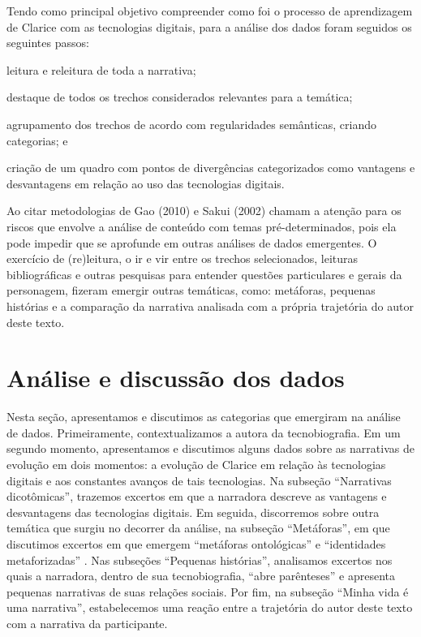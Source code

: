 \documentclass{textolivre}
\begin{document}
Tendo como principal objetivo compreender como foi o processo de aprendizagem de Clarice com as tecnologias digitais, para a análise dos dados foram seguidos os seguintes passos: 
\begin{enumerate*}[label=\itshape\arabic*\upshape)]
\item leitura e releitura de toda a narrativa; 
\item destaque de todos os trechos considerados relevantes para a temática; 
\item agrupamento dos trechos de acordo com regularidades semânticas, criando categorias; e 
\item criação de um quadro com pontos de divergências categorizados como vantagens e desvantagens em relação ao uso das tecnologias digitais.
\end{enumerate*}

Ao citar metodologias de Gao (2010) e Sakui (2002) \textcite{barkuizen2014} chamam a atenção para os riscos que envolve a análise de conteúdo com temas pré-determinados, pois ela pode impedir que se aprofunde em outras análises de dados emergentes. O exercício de (re)leitura, o ir e vir entre os trechos selecionados, leituras bibliográficas e outras pesquisas para entender questões particulares e gerais da personagem, fizeram emergir outras temáticas, como: metáforas, pequenas histórias e a comparação da narrativa analisada com a própria trajetória do autor deste texto.

\section{Análise e discussão dos dados}\label{sec-analise}
Nesta seção, apresentamos e discutimos as categorias que emergiram na análise de dados. Primeiramente, contextualizamos a autora da tecnobiografia. Em um segundo momento, apresentamos e discutimos alguns dados sobre as narrativas de evolução em dois momentos: a evolução de Clarice em relação às tecnologias digitais e aos constantes avanços de tais tecnologias. Na subseção “Narrativas dicotômicas”, trazemos excertos em que a narradora descreve as vantagens e desvantagens das tecnologias digitais. Em seguida, discorremos sobre outra temática que surgiu no decorrer da análise, na subseção “Metáforas”, em que discutimos excertos em que emergem “metáforas ontológicas” \cite{lakoff1980} e “identidades metaforizadas” \cite{gomes2016}. Nas subseções “Pequenas histórias”, analisamos excertos nos quais a narradora, dentro de sua tecnobiografia, “abre parênteses” e apresenta pequenas narrativas de suas relações sociais. Por fim, na subseção “Minha vida é uma narrativa”, estabelecemos uma reação entre a trajetória do autor deste texto com a narrativa da participante.
\end{document}
